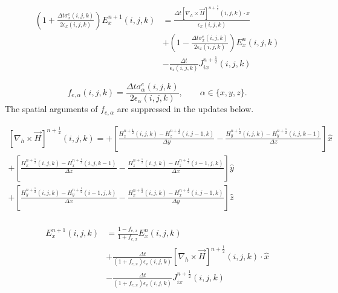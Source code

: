 \documentclass[10pt]{article}
\begin{document}
\begin{equation}
	\begin{aligned}
		\left(1 + \frac{\Delta t \sigma^{e}_{x}(i,j,k)}{2\epsilon_{x}(i,j,k)} \right) E^{n+1}_{x}(i,j,k) & =
		\frac{\Delta t \left[ \nabla_h \times \vec{H} \right]^{n+\frac{1}{2}}(i,j,k) \cdot \hat{x}}{\epsilon_{{x}}(i,j,k)}                                                                                       \\
		                                                                                                 & + \left( 1 - \frac{\Delta t \sigma^{e}_{x}(i,j,k)}{2\epsilon_{x}(i,j,k)} \right)   E^{n}_{x}(i,j,k) \\
		                                                                                                 & - \frac{\Delta t}{\epsilon_{x}(i,j,k)} J^{n+\frac{1}{2}}_{ix}(i,j,k)
	\end{aligned}
\end{equation}

\begin{equation}
	\boxed{
		f_{e,\alpha}(i,j,k) = \frac{\Delta t \sigma^{e}_{\alpha}(i,j,k)}{2\epsilon_{\alpha}(i,j,k)},
        \qquad \alpha\in\{x,y,z\}.
	}
\end{equation}
The spatial arguments of $f_{e,\alpha}$ are suppressed in the updates below.


\begin{equation}
	\boxed{
		\begin{aligned}
			\left[\nabla_h \times \vec{H} \right]^{n+\frac{1}{2}}(i,j,k) =
			+\left[\frac{H^{n+\frac{1}{2}}_{z}(i,j,k)-H^{n+\frac{1}{2}}_{z}(i,j-1,k)}{\Delta y}
			-\frac{H^{n+\frac{1}{2}}_{y}(i,j,k)-H^{n+\frac{1}{2}}_{y}(i,j,k-1)}{\Delta z} \right] \hat{x} \\
			+\left[\frac{H^{n+\frac{1}{2}}_{x}(i,j,k)-H^{n+\frac{1}{2}}_{x}(i,j,k-1)}{\Delta z}
			-\frac{H^{n+\frac{1}{2}}_{z}(i,j,k)-H^{n+\frac{1}{2}}_{z}(i-1,j,k)}{\Delta x} \right] \hat{y} \\
			+\left[\frac{H^{n+\frac{1}{2}}_{y}(i,j,k)-H^{n+\frac{1}{2}}_{y}(i-1,j,k)}{\Delta x}
			-\frac{H^{n+\frac{1}{2}}_{x}(i,j,k)-H^{n+\frac{1}{2}}_{x}(i,j-1,k)}{\Delta y} \right] \hat{z} \\
		\end{aligned}
	}
\end{equation}

\begin{equation}
    \label{eq:yee-e-x}
	\boxed{
		\begin{aligned}
			E^{n+1}_{x}(i,j,k) & = \frac{1-f_{e,x}}{1+f_{e,x}}  E^{n}_{x}(i,j,k)                                                                                 \\
			                   & + \frac{\Delta t}{(1+f_{e,x})\epsilon_{x}(i,j,k)} \left[ \nabla_h \times \vec{H} \right]^{n+\frac{1}{2}}(i,j,k) \cdot \hat{x} \\
			                   & - \frac{\Delta t}{(1+f_{e,x})\epsilon_{x}(i,j,k)} J^{n+\frac{1}{2}}_{ix}(i,j,k)
		\end{aligned}
	}
\end{equation}
\end{document}
